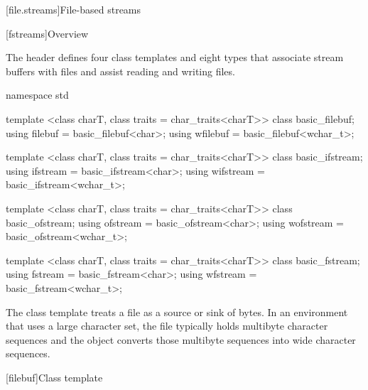 [file.streams]{File-based streams}

[fstreams]{Overview}

\pnum
The header
defines four class templates and eight types
that associate stream buffers with files and assist
reading and writing files.

%
%
%
%
%
%
%
%
%
%
%
%
%
%
%
%
%
\begin{codeblock}
namespace std {
  template <class charT, class traits = char_traits<charT>>
    class basic_filebuf;
  using filebuf  = basic_filebuf<char>;
  using wfilebuf = basic_filebuf<wchar_t>;

  template <class charT, class traits = char_traits<charT>>
    class basic_ifstream;
  using ifstream  = basic_ifstream<char>;
  using wifstream = basic_ifstream<wchar_t>;

  template <class charT, class traits = char_traits<charT>>
    class basic_ofstream;
  using ofstream  = basic_ofstream<char>;
  using wofstream = basic_ofstream<wchar_t>;

  template <class charT, class traits = char_traits<charT>>
    class basic_fstream;
  using fstream  = basic_fstream<char>;
  using wfstream = basic_fstream<wchar_t>;
}
\end{codeblock}

\pnum
\begin{note} The class template  treats a file as a source or
sink of bytes. In an environment that uses a large character set, the file
typically holds multibyte character sequences and the 
object converts those multibyte sequences into wide character sequences.
\end{note}

[filebuf]{Class template }

